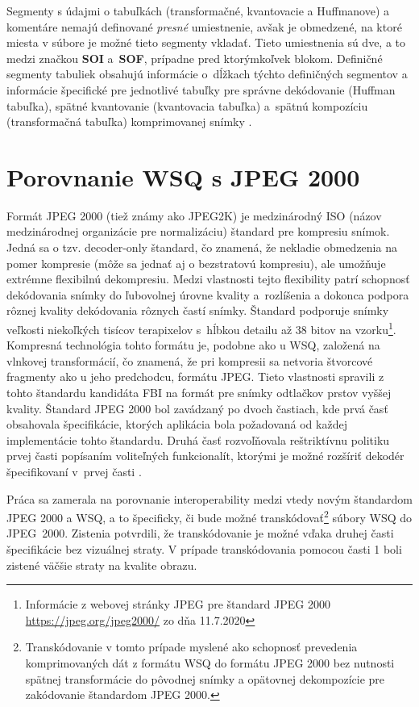   Segmenty s údajmi o tabuľkách (transformačné, kvantovacie a Huffmanove) a komentáre nemajú definované \emph{presné} umiestnenie, avšak je obmedzené,
  na ktoré miesta v súbore je možné tieto segmenty vkladať. Tieto umiestnenia sú dve, a to medzi značkou \textbf{SOI} a~{\textbf{SOF}}, prípadne pred ktorýmkoľvek
  blokom. Definičné segmenty tabuliek obsahujú informácie o~dĺžkach týchto definičných segmentov a informácie špecifické pre jednotlivé tabuľky pre správne
  dekódovanie (Huffman tabuľka), spätné kvantovanie (kvantovacia tabuľka) a~spätnú kompozíciu (transformačná tabuľka) komprimovanej
  snímky \cite{WSQSpecification,brislawn1996compression}.

  \section{Porovnanie WSQ s JPEG 2000}
  Formát JPEG 2000 (tiež známy ako JPEG2K) je medzinárodný ISO (názov medzinárodnej organizácie pre normalizáciu) štandard pre kompresiu snímok.
  Jedná sa o tzv. decoder-only štandard, čo znamená, že nekladie obmedzenia
  na pomer kompresie (môže sa jednať aj o bezstratovú kompresiu), ale umožňuje extrémne flexibilnú dekompresiu. Medzi vlastnosti tejto flexibility patrí
  schopnosť dekódovania snímky do ľubovolnej úrovne kvality a~rozlíšenia a dokonca podpora rôznej kvality dekódovania rôznych častí snímky. Štandard podporuje
  snímky veľkosti niekoľkých tisícov terapixelov s~hĺbkou detailu až 38 bitov na vzorku\footnote{Informácie z webovej stránky JPEG pre štandard JPEG 2000
  \url{https://jpeg.org/jpeg2000/} zo dňa 11.7.2020}. Kompresná technológia tohto formátu je, podobne ako u WSQ, založená na
  vlnkovej transformácií, čo znamená, že pri kompresii sa netvoria štvorcové fragmenty ako u jeho predchodcu, formátu JPEG. Tieto vlastnosti spravili z tohto
  štandardu kandidáta FBI na formát pre snímky odtlačkov prstov vyššej kvality. Štandard JPEG 2000 bol zavádzaný po dvoch častiach, kde prvá časť obsahovala
  špecifikácie, ktorých aplikácia bola požadovaná od každej implementácie tohto štandardu. Druhá časť rozvoľňovala reštriktívnu politiku prvej časti popísaním
  voliteľných funkcionalít, ktorými je možné rozšíriť dekodér špecifikovaní v~prvej časti \cite{lepley2001jpeg,Libert}.

  Práca \cite{lepley2001jpeg} sa zamerala na porovnanie interoperability medzi vtedy novým štandardom JPEG 2000 a WSQ, a to špecificky, či bude možné
  transkódovať\footnote{Transkódovanie v tomto prípade myslené ako schopnosť prevedenia komprimovaných dát z formátu WSQ do formátu JPEG 2000 bez nutnosti
  spätnej transformácie do pôvodnej snímky a opätovnej dekompozície pre zakódovanie štandardom JPEG 2000.} súbory WSQ do JPEG~2000. Zistenia potvrdili,
  že transkódovanie je možné vďaka druhej časti špecifikácie bez vizuálnej straty. V prípade transkódovania pomocou časti 1 boli zistené väčšie straty
  na kvalite obrazu.

